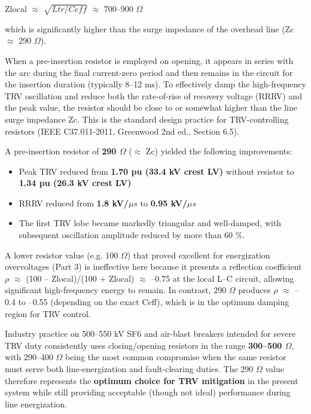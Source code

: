 Zlocal $\approx$ $\sqrt{Ltr/Ceff}$ $\approx$ 700--900 $\Omega$

which is significantly higher than the surge impedance of the overhead line (Zc $\approx$ 290 $\Omega$).

When a pre-insertion resistor is employed on opening, it appears in series with the arc during the final current-zero period and then remains in the circuit for the insertion duration (typically 8--12 ms). To effectively damp the high-frequency TRV oscillation and reduce both the rate-of-rise of recovery voltage (RRRV) and the peak value, the resistor should be close to or somewhat higher than the line surge impedance Zc. This is the standard design practice for TRV-controlling resistors (IEEE C37.011-2011, Greenwood 2nd ed., Section 6.5).

A pre-insertion resistor of \textbf{290 $\Omega$} ($\approx$ Zc) yielded the following improvements:

\begin{itemize}
\item Peak TRV reduced from \textbf{1.70 pu (33.4 kV crest LV)} without resistor to \textbf{1.34 pu (26.3 kV crest LV)}
\item RRRV reduced from \textbf{1.8 kV/$\mu s$} to \textbf{0.95 kV/$\mu s$}
\item The first TRV lobe became markedly triangular and well-damped, with subsequent oscillation amplitude reduced by more than 60 \%.
\end{itemize}

A lower resistor value (e.g. 100 $\Omega$) that proved excellent for energization overvoltages (Part 3) is ineffective here because it presents a reflection coefficient $\rho$ $\approx$ (100 -- Zlocal)/(100 + Zlocal) $\approx$ --0.75 at the local L--C circuit, allowing significant high-frequency energy to remain. In contrast, 290 $\Omega$ produces $\rho$ $\approx$ --0.4 to --0.55 (depending on the exact Ceff), which is in the optimum damping region for TRV control.

Industry practice on 500--550 kV SF6 and air-blast breakers intended for severe TRV duty consistently uses closing/opening resistors in the range \textbf{300--500 $\Omega$}, with 290--400 $\Omega$ being the most common compromise when the same resistor must serve both line-energization and fault-clearing duties. The 290 $\Omega$ value therefore represents the \textbf{optimum choice for TRV mitigation} in the present system while still providing acceptable (though not ideal) performance during line energization.

